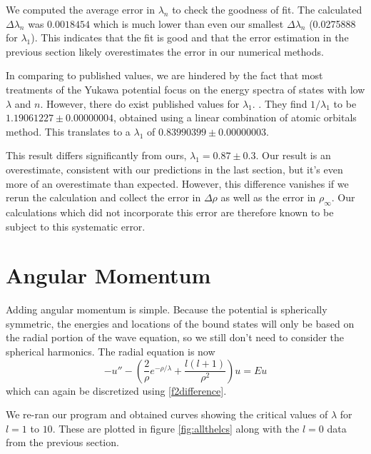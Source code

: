 \documentclass[12pt,twoside]{reedthesis}
\newcommand{\eqn}[1]{\begin{equation}#1\end{equation}}
\begin{document}
We computed the average error in $\lambda_n$ to check the goodness of fit. The calculated $\Delta \lambda_n$ was $0.0018454$ which is much lower than even our smallest $\Delta \lambda_n$ (0.0275888 for $\lambda_1$). This indicates that the fit is good and that the error estimation in the previous section likely overestimates the error in our numerical methods.

In comparing to published values, we are hindered by the fact that most treatments of the Yukawa potential focus on the energy spectra of states with low $\lambda$ and $n$. However, there do exist published values for $\lambda_1$. \cite{PhysRevA.50.228}. They find $1 / \lambda_1$ to be $1.19061227 \pm 0.00000004$, obtained using a linear combination of atomic orbitals method. This translates to a $\lambda_1$ of $0.83990399 \pm 0.00000003$. 

This result differs significantly from ours, $\lambda_1 = 0.87 \pm 0.3$. Our result is an overestimate, consistent with our predictions in the last section, but it's even more of an overestimate than expected. However, this difference vanishes if we rerun the calculation and collect the error in $\Delta \rho$ as well as the error in $\rho_{\infty}$. Our calculations which did not incorporate this error are therefore known to be subject to this systematic error.

\section{Angular Momentum}

Adding angular momentum is simple. Because the potential is spherically symmetric, the energies and locations of the bound states will only be based on the radial portion of the wave equation, so we still don't need to consider the spherical harmonics. The radial equation is now
\eqn{
-u'' - \left(\frac{2}{\rho}e^{-\rho/\lambda} + \frac{l(l+1)}{\rho^2}\right) u = E u
\label{eq:angmomentum}
}
which can again be discretized using \eqref{f2difference}. 

We re-ran our program and obtained curves showing the critical values of $\lambda$ for $l = 1$ to $10$. These are plotted in figure \ref{fig:allthelcs} along with the $l = 0$ data from the previous section.
\end{document}
